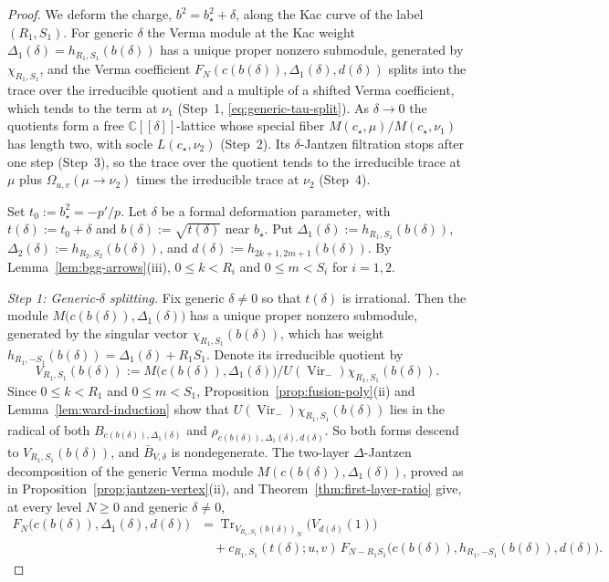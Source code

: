 \documentclass[twoside,10pt]{article}
\numberwithin{equation}{section}
\theoremstyle{slbody}
\theoremstyle{definition}
\theoremstyle{remark}
\newcommand{\Vir}{\operatorname{Vir}}
\newcommand{\Tr}{\operatorname{Tr}}
\begin{document}
\begin{proof}
We deform the charge, \(b^2=b_\star^2+\delta\), along the Kac curve of the label
\((R_1,S_1)\).  For generic \(\delta\) the Verma module at the Kac weight
\(\Delta_1(\delta)=h_{R_1,S_1}(b(\delta))\) has a unique proper nonzero submodule,
generated by \(\chi_{R_1,S_1}\), and the Verma coefficient
\(F_N(c(b(\delta)),\Delta_1(\delta),d(\delta))\) splits into the trace over the
irreducible quotient and a multiple of a shifted Verma coefficient, which tends
to the term at \(\nu_1\) (Step~1, \eqref{eq:generic-tau-split}).  As \(\delta\to0\) the quotients form a
free \(\mathbb{C}[[\delta]]\)-lattice whose special fiber
\(M(c_\star,\mu)/M(c_\star,\nu_1)\) has length two, with socle
\(L(c_\star,\nu_2)\) (Step~2).  Its \(\delta\)-Jantzen filtration stops after one
step (Step~3), so the trace over the quotient tends to the irreducible trace at
\(\mu\) plus \(\Omega_{u,v}(\mu\to\nu_2)\) times the irreducible trace at
\(\nu_2\) (Step~4).

Set \(t_0:=b_\star^2=-p'/p\).  Let \(\delta\) be a formal deformation
parameter, with \(t(\delta):=t_0+\delta\) and \(b(\delta):=\sqrt{t(\delta)}\) near
\(b_\star\).  Put \(\Delta_1(\delta):=h_{R_1,S_1}(b(\delta))\),
\(\Delta_2(\delta):=h_{R_2,S_2}(b(\delta))\), and
\(d(\delta):=h_{2k+1,2m+1}(b(\delta))\).  By Lemma~\ref{lem:bgg-arrows}(iii),
\(0\leq k<R_i\) and \(0\leq m<S_i\) for \(i=1,2\).

\emph{Step 1: Generic-\(\delta\) splitting.}
Fix generic \(\delta\neq0\) so that \(t(\delta)\) is irrational.  Then the module
\(M\bigl(c(b(\delta)),\Delta_1(\delta)\bigr)\) has a unique proper nonzero
submodule, generated by the singular vector \(\chi_{R_1,S_1}(b(\delta))\), which
has weight \(h_{R_1,-S_1}(b(\delta))=\Delta_1(\delta)+R_1S_1\).  Denote its
irreducible quotient by
\[
 V_{R_1,S_1}(b(\delta))
 :=M\bigl(c(b(\delta)),\Delta_1(\delta)\bigr)\big/
   U(\Vir_-)\chi_{R_1,S_1}(b(\delta)).
\]
Since \(0\leq k<R_1\) and \(0\leq m<S_1\), Proposition~\ref{prop:fusion-poly}(ii)
and Lemma~\ref{lem:ward-induction} show that
\(U(\Vir_-)\chi_{R_1,S_1}(b(\delta))\) lies in the radical of both
\(B_{c(b(\delta)),\Delta_1(\delta)}\) and
\(\rho_{c(b(\delta)),\Delta_1(\delta),d(\delta)}\).  So both forms descend to
\(V_{R_1,S_1}(b(\delta))\), and \(\bar B_{V,\delta}\) is nondegenerate.  The
two-layer \(\Delta\)-Jantzen decomposition of the generic Verma module
\(M(c(b(\delta)),\Delta_1(\delta))\), proved as in
Proposition~\ref{prop:jantzen-vertex}(ii), and
Theorem~\ref{thm:first-layer-ratio} give, at every level \(N\geq0\) and
generic \(\delta\neq0\),
\begin{equation}\label{eq:generic-tau-split}
 \begin{aligned}
  F_N\bigl(c(b(\delta)),\Delta_1(\delta),d(\delta)\bigr)
  &=\Tr_{V_{R_1,S_1}(b(\delta))_N}\bigl(V_{d(\delta)}(1)\bigr)\\
  &\quad+c_{R_1,S_1}(t(\delta);u,v)\,
    F_{N-R_1S_1}\bigl(c(b(\delta)),h_{R_1,-S_1}(b(\delta)),d(\delta)\bigr).
 \end{aligned}
\end{equation}


\end{proof}
\end{document}
